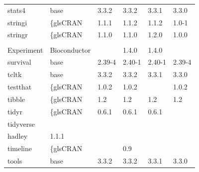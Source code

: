\begin{longtable}{llllll}
\rowcolor{black!10}
stats4                        & base                      & 3.3.2       & 3.3.2       & 3.3.1          & 3.3.0             \\
\rowcolor{black!5}
stringi                       & \{gls{CRAN}                      & 1.1.1       & 1.1.2       & 1.1.2          & 1.0-1              \\
\rowcolor{black!10}
stringr                       & \{gls{CRAN}                      & 1.1.0       & 1.1.0       & 1.2.0          & 1.0.0             \\
\rowcolor{black!5}
\begin{tabular}[c]{@{}l@{}}Summarized\\Experiment \end{tabular}          & Bioconductor              &             & 1.4.0       & 1.4.0          &                    \\
\rowcolor{black!10}
survival                      & base                      & 2.39-4      & 2.40-1      & 2.40-1         & 2.39-4            \\
\rowcolor{black!5}
tcltk                         & base                      & 3.3.2       & 3.3.2       & 3.3.1          & 3.3.0              \\
\rowcolor{black!10}
testthat                      & \{gls{CRAN}                      & 1.0.2       & 1.0.2       &                & 1.0.2             \\
\rowcolor{black!5}
tibble                        & \{gls{CRAN}                      & 1.2         & 1.2         & 1.2            & 1.2                \\
\rowcolor{black!10}
tidyr                         & \{gls{CRAN}                      & 0.6.1       & 0.6.1       & 0.6.1          &                   \\
\rowcolor{black!5}
tidyverse                     & \begin{tabular}[c]{@{}l@{}}GitHub \\ hadley \end{tabular}            & 1.1.1       &             &                &                    \\
\rowcolor{black!10}
timeline                      & \{gls{CRAN}                      &             & 0.9         &                &                   \\
\rowcolor{black!5}
tools                         & base                      & 3.3.2       & 3.3.2       & 3.3.1          & 3.3.0              \\

\end{longtable}
